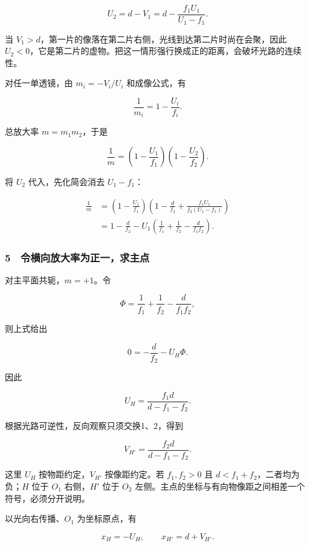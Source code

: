 \documentclass[12pt,a4paper,fontset=fandol]{ctexart}
\begin{document}
\[U_2=d-V_1=d-\frac{f_1U_1}{U_1-f_1}.\]

当 \(V_1>d\)，第一片的像落在第二片右侧，光线到达第二片时尚在会聚，因此
\(U_2<0\)，它是第二片的虚物。把这一情形强行换成正的距离，会破坏光路的连续性。

对任一单透镜，由 \(m_i=-V_i/U_i\) 和成像公式，有

\[\frac1{m_i}=1-\frac{U_i}{f_i}.\]

总放大率 \(m=m_1m_2\)，于是

\[\frac1m=\left(1-\frac{U_1}{f_1}\right)
\left(1-\frac{U_2}{f_2}\right).\]

将 \(U_2\) 代入，先化简会消去 \(U_1-f_1\)：

\[\begin{aligned}
\frac1m
&=\left(1-\frac{U_1}{f_1}\right)
\left(1-\frac d{f_2}+\frac{f_1U_1}{f_2(U_1-f_1)}\right)\\
&=1-\frac d{f_2}-U_1
\left(\frac1{f_1}+\frac1{f_2}-\frac d{f_1f_2}\right).
\end{aligned}\]

\subsubsection{5　令横向放大率为正一，求主点}\label{ux4ee4ux6a2aux5411ux653eux5927ux7387ux4e3aux6b63ux4e00ux6c42ux4e3bux70b9}

对主平面共轭，\(m=+1\)。令

\[\Phi=\frac1{f_1}+\frac1{f_2}-\frac d{f_1f_2},\]

则上式给出

\[0=-\frac d{f_2}-U_H\Phi.\]

因此

\[\boxed{U_H=\frac{f_1d}{d-f_1-f_2}.}\]

根据光路可逆性，反向观察只须交换1、2，得到

\[\boxed{V_{H'}=\frac{f_2d}{d-f_1-f_2}.}\]

这里 \(U_H\) 按物距约定，\(V_{H'}\) 按像距约定。若 \(f_1,f_2>0\) 且
\(d<f_1+f_2\)，二者均为负；\(H\) 位于 \(O_1\) 右侧，\(H'\) 位于 \(O_2\)
左侧。主点的坐标与有向物像距之间相差一个符号，必须分开说明。

以光向右传播、\(O_1\) 为坐标原点，有

\[x_H=-U_H,\qquad x_{H'}=d+V_{H'}.\]
\end{document}
